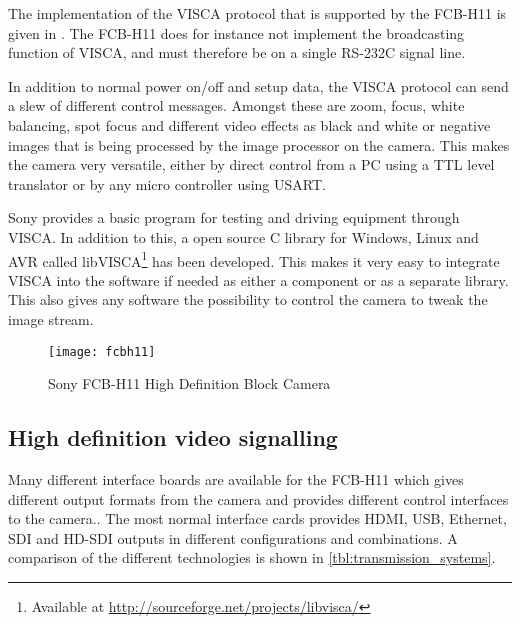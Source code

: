 The implementation of the VISCA protocol that is supported by the FCB-H11 is given in \citet{fcbh11tech}. 
The FCB-H11 does for instance not implement the broadcasting function of VISCA, and must therefore 
be on a single RS-232C signal line. 

In addition to normal power on/off and setup data, the VISCA protocol can send a slew of different 
control messages. Amongst these are zoom, focus, white balancing, spot focus and different video effects as 
black and white or negative images that is being processed by the image processor on the camera. This 
makes the camera very versatile, either by direct control from a PC using a TTL level translator or 
by any micro controller using USART.

Sony provides a basic program for testing and driving equipment through VISCA. In addition to this, a open source C library for Windows, Linux and 
AVR called libVISCA\footnote{Available at \url{http://sourceforge.net/projects/libvisca/}} has been developed. This makes it very easy to 
integrate VISCA into the software if needed as either a component or as a separate library. This also gives any software the 
possibility to control the camera to tweak the image stream.

\begin{figure}[htbp]
	\centering
	\texttt{[image: fcbh11]}
	\caption{Sony FCB-H11 High Definition Block Camera}
	\label{fig:fcb-h11}
\end{figure}

\subsection{High definition video signalling}

Many different interface boards are available for the FCB-H11 which gives different output formats from the camera and 
provides different control interfaces to the camera..
The most normal interface cards provides HDMI, USB, Ethernet, SDI and HD-SDI outputs in 
different configurations and combinations. A comparison of the different technologies is shown in \vref{tbl:transmission_systems}.

